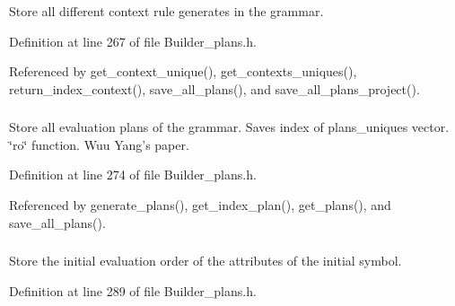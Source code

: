 Store all different context rule generates in the grammar. 



Definition at line 267 of file Builder\_\-plans.h.

Referenced by get\_\-context\_\-unique(), get\_\-contexts\_\-uniques(), return\_\-index\_\-context(), save\_\-all\_\-plans(), and save\_\-all\_\-plans\_\-project().\hypertarget{classgenevalmag_1_1Builder__plans_02c97bab7b3561f4dde009b974255dfe}{
\subsubsection[{eval\_\-plans}]{}}
\label{classgenevalmag_1_1Builder__plans_02c97bab7b3561f4dde009b974255dfe}


Store all evaluation plans of the grammar. Saves index of plans\_\-uniques vector. \char`\"{}ro\char`\"{} function. Wuu Yang's paper. 



Definition at line 274 of file Builder\_\-plans.h.

Referenced by generate\_\-plans(), get\_\-index\_\-plan(), get\_\-plans(), and save\_\-all\_\-plans().\hypertarget{classgenevalmag_1_1Builder__plans_be50c9e30276ceaeea344f6a95f23db8}{
\subsubsection[{init\_\-order\_\-ag}]{}}
\label{classgenevalmag_1_1Builder__plans_be50c9e30276ceaeea344f6a95f23db8}


Store the initial evaluation order of the attributes of the initial symbol. 



Definition at line 289 of file Builder\_\-plans.h.


